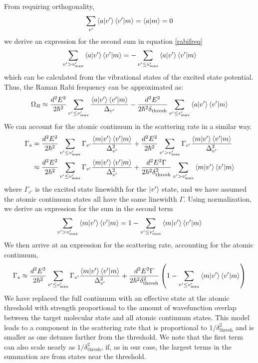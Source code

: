 \documentclass[aps,secnumarabic,amsmath,amssymb,10pt,superscriptaddress]{revtex4}
\begin{document}
From requiring orthogonality,
\begin{equation}
  \displaystyle\sum_{v'} \braket{a|v'}\braket{v'|m} = \braket{a|m} = 0
\end{equation}
we derive an expression for the second sum in equation \ref{rabifreq}
\begin{equation}
  \displaystyle\sum_{v'> v'_{\text{max}}} \braket{a|v'}\braket{v'|m} = -\displaystyle\sum_{v' \leq v'_{\text{max}}} \braket{a|v'}\braket{v'|m}
\end{equation}
which can be calculated from the vibrational states of the excited state potential. Thus, the Raman Rabi frequency can be approximated as:
\begin{equation}
  \Omega_R \approx \frac{d^2E^2}{2\hbar^2}\displaystyle\sum_{v' \leq v'_{\text{max}}} \frac{\braket{a|v'}\braket{v'|m}}{\Delta_{v'}} -  \frac{d^2E^2}{2\hbar^2\delta_{\text{thresh}}}\displaystyle\sum_{v' \leq v'_{\text{max}}} \braket{a|v'}\braket{v'|m}
\end{equation}
We can account for the atomic continuum in the scattering rate in a similar way.
\begin{align}
  \Gamma_s &= \frac{d^2E^2}{2\hbar^2}\displaystyle\sum_{v' \leq v'_{\text{max}}}\Gamma_{v'} \frac{\braket{m|v'}\braket{v'|m}}{\Delta_{v'}^2} + \frac{d^2E^2}{2\hbar^2}\displaystyle\sum_{v' > v'_{\text{max}}}\Gamma_{v'} \frac{\braket{m|v'}\braket{v'|m}}{\Delta_{v'}^2} \\
           &\approx \frac{d^2E^2}{2\hbar^2}\displaystyle\sum_{v' \leq v'_{\text{max}}}\Gamma_{v'} \frac{\braket{m|v'}\braket{v'|m}}{\Delta_{v'}^2} + \frac{d^2E^2\Gamma}{2\hbar^2\delta_{\text{thresh}}^2}\displaystyle\sum_{v' > v'_{\text{max}}}\braket{m|v'}\braket{v'|m}
\end{align}
where $\Gamma_{v'}$ is the excited state linewidth for the $\ket{v'}$ state, and we have assumed the atomic continuum states all have the same linewidth $\Gamma$. Using normalization, we derive an expression for the sum in the second term
\begin{equation}
  \displaystyle\sum_{v' > v'_{\text{max}}}\braket{m|v'}\braket{v'|m} = 1 - \displaystyle\sum_{v' \leq v'_{\text{max}}}\braket{m|v'}\braket{v'|m}
\end{equation}
We then arrive at an expression for the scattering rate, accounting for the atomic continuum,
\begin{equation}
  \Gamma_s \approx \frac{d^2E^2}{2\hbar^2}\displaystyle\sum_{v' \leq v'_{\text{max}}}\Gamma_{v'} \frac{\braket{m|v'}\braket{v'|m}}{\Delta_{v'}^2} +  \frac{d^2E^2\Gamma}{2\hbar^2\delta_{\text{thresh}}^2}\left(1 - \displaystyle\sum_{v' \leq v'_{\text{max}}}\braket{m|v'}\braket{v'|m}\right)
\end{equation}
We have replaced the full continuum with an effective state at the atomic threshold with strength proportional to the amount of wavefunction overlap between the target molecular state and all atomic continuum states. This model leads to a component in the scattering rate that is proportional to $ 1/\delta_{\text{thresh}}^2$ and is smaller as one detunes farther from the threshold. We note that the first term can also scale nearly as $1/\delta_{\text{thresh}}^2 $, if, as in our case, the largest terms in the summation are from states near the threshold.
\end{document}

